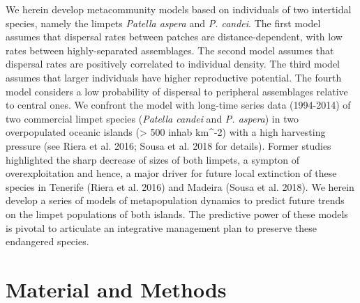 \documentclass[12pt]{article}
\begin{document}
\begin{flushleft}
We herein develop metacommunity models based on individuals of two intertidal species, namely the limpets \textit{Patella aspera} and \textit{P. candei}. The first model assumes that dispersal rates between patches are distance-dependent, with low rates between highly-separated assemblages. The second model assumes that dispersal rates are positively correlated to individual density. The third model assumes that larger individuals have higher reproductive potential. The fourth model considers a low probability of dispersal to peripheral assemblages relative to central ones. We confront the model with long-time series data (1994-2014) of two commercial limpet species (\textit{Patella candei} and \textit{P. aspera}) in two overpopulated oceanic islands (> 500 inhab km^{-2}) with a high harvesting pressure (see Riera et al. 2016; Sousa et al. 2018 for details). Former studies highlighted the sharp decrease of sizes of both limpets, a sympton of overexploitation and hence, a major driver for future local extinction of these species in Tenerife (Riera et al. 2016) and Madeira (Sousa et al. 2018). We herein develop a series of models  of metapopulation dynamics to predict future trends on the limpet populations of both islands. The predictive power of these models is pivotal to articulate an integrative management plan to preserve these endangered species.

\section{Material and Methods}



\end{flushleft}
\end{document}
